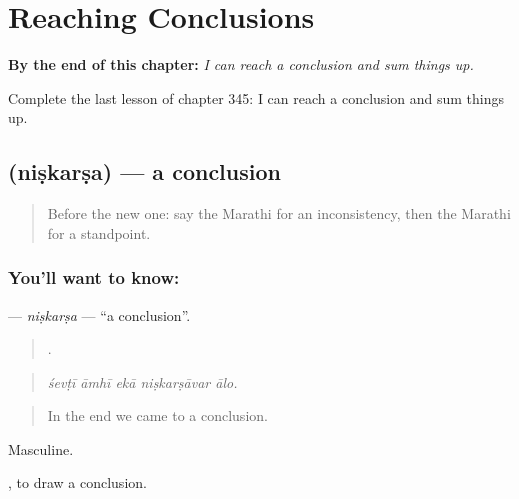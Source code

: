 
\chapter{Reaching Conclusions}
\label{ch:mr-reaching-conclusions}

\begin{chapteropening}
\textbf{By the end of this chapter:} \emph{I can reach a conclusion and sum things up.}

Complete the last lesson of chapter 345: I can reach a conclusion and sum things up.
\end{chapteropening}

\section[\texorpdfstring{\mr{निष्कर्ष} (niṣkarṣa)}{निष्कर्ष (niṣkarṣa)}]{ (niṣkarṣa) — a conclusion}

\label{lesson:MR-C345-niskarsa}



\begin{quote}
Before the new one: say the Marathi for an inconsistency, then the Marathi for a standpoint.
\end{quote}

\subsection*{You'll want to know: }
\textbf{} — \emph{niṣkarṣa} — \textquotedblleft{}a conclusion\textquotedblright{}.

\begin{quote}
    .
\end{quote}

\begin{quote}
\emph{śevṭī āmhī ekā niṣkarṣāvar ālo.}
\end{quote}

\begin{quote}
In the end we came to a conclusion.
\end{quote}

Masculine.

 , to draw a conclusion.

